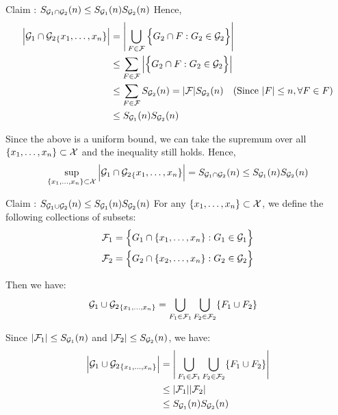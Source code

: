 \begin{solution*}
\begin{subproof}{\newline Claim : $S_{\mathcal{G}_1 \cap \mathcal{G}_2}(n) \le S_{\mathcal{G}_1}(n)S_{\mathcal{G}_2}(n)$}
        \noindent Hence,
        \begin{align*}
            \bigAbs{{\G_1 \cap \G_2}_\{x_1, \dots, x_n \}} 
                &= \biggAbs{
                    \bigcup_{F \in \F} \bigCurl{
                        G_2 \cap F : G_2 \in \G_2
                    }
                } \\
                &\le \sum_{F\in\F} \bigAbs{ \bigCurl{
                    G_2 \cap F : G_2 \in \G_2
                }} \\
                &\le \sum_{F\in\F} S_{\G_2}(n) = |\F|S_{\G_2}(n)  \ \ \ (\text{Since } |F| \le n, \forall F\in F)  \\
                &\le S_{\G_1}(n) S_{\G_2}(n)
        \end{align*}

        \noindent Since the above is a uniform bound, we can take the supremum over all $\{x_1, \dots, x_n\}\subset \mathcal{X}$ and the inequality still holds. Hence,
        \begin{align*}
            \sup_{\{ x_1, \dots, x_n \} \subset \mathcal{X}} \Big| 
                {\mathcal{G}_1 \cap \mathcal{G}_2}_\{x_1, \dots, x_n \}
             \Big| = S_{\mathcal{G}_1 \cap \mathcal{G}_2}(n) \le S_{\mathcal{G}_1}(n)S_{\mathcal{G}_2}(n)
        \end{align*}
    \end{subproof}

    \begin{subproof}{\newline Claim : $S_{\mathcal{G}_1 \cup \mathcal{G}_2}(n) \le S_{\mathcal{G}_1}(n)S_{\mathcal{G}_2}(n)$}
        For any $\{x_1, \dots, x_n \} \subset \mathcal{X}$, we define the following collections of subsets:
        \begin{align*}
            \mathcal{F}_1 &= \Big\{ 
                G_1 \cap \{ x_1, \dots, x_n \} : G_1 \in \mathcal{G}_1
             \Big\} \\
            \mathcal{F}_2 &= \Big\{ 
                G_2 \cap \{ x_2, \dots, x_n \} : G_2 \in \mathcal{G}_2
             \Big\}
        \end{align*}

        \noindent Then we have:
        \begin{align*}
            {\mathcal{G}_1 \cup \mathcal{G}_2}_{\{x_1, \dots, x_n \}} 
                &= \bigcup_{F_1 \in \mathcal{F}_1} \bigcup_{F_2\in\mathcal{F}_2} \{ F_1 \cup F_2 \}
        \end{align*}

        \noindent Since $|\mathcal{F}_1| \le S_{\mathcal{G}_1}(n)$ and $|\mathcal{F}_2| \le S_{\mathcal{G}_2}(n)$, we have:
        \begin{align*}
            \Big| {\mathcal{G}_1 \cup \mathcal{G}_2}_{\{x_1, \dots, x_n \}} \Big|
                &= \Bigg| \bigcup_{F_1 \in \mathcal{F}_1} \bigcup_{F_2\in\mathcal{F}_2} \{ F_1 \cup F_2 \} \Bigg| \\
                &\le |\mathcal{F}_1||\mathcal{F}_2| \\
                &\le S_{\mathcal{G}_1}(n)S_{\mathcal{G}_2}(n)
        \end{align*}


\end{subproof}
\end{solution*}
